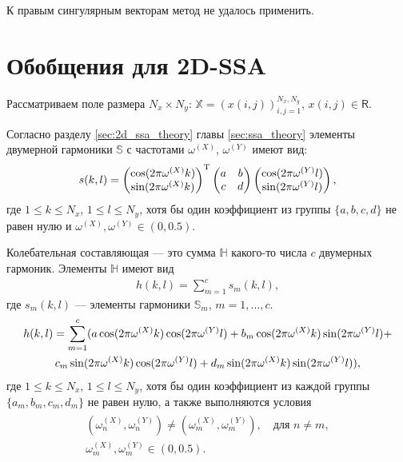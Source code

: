 \documentclass[specialist,
               substylefile = spbu.rtx,
               subf,href,colorlinks=true, 12pt]{disser}
\begin{document}
К правым сингулярным векторам метод не удалось применить.

\newpage
\section{Обобщения для 2D-SSA}

Рассматриваем поле размера $N_x \times N_y$: $\mathbb{X}= \left(x(i,j) \right)_{i,j=1}^{N_x,N_y}$, $x(i,j) \in \mathsf{R}$.

Согласно разделу \ref{sec:2d_ssa_theory} главы \ref{sec:ssa_theory} элементы двумерной гармоники $\mathbb{S}$ с частотами $\omega^{(X)}$, $\omega^{(Y)}$ имеют вид:
\begin{gather} \label{eq:2d_cos_el}
\notag
s(k,l) =  \left(
\begin{matrix}
\cos(2\pi \omega^{(X)}k) \\ \notag
\sin(2\pi \omega^{(X)}k)
\end{matrix}
\right)^{\mathrm{T}}
 \left(
\begin{matrix}
a & b \\
c & d
\end{matrix}
\right)
 \left(
\begin{matrix}
\cos(2\pi \omega^{(Y)}l) \\ \notag
\sin(2\pi \omega^{(Y)}l)
\end{matrix}
\right),
\notag
\end{gather}
где $1 \leqslant k \leqslant N_x$, $1 \leqslant l \leqslant N_y$, хотя бы один коэффициент из  группы $\{a,b,c,d\}$ не равен нулю и
$\omega^{(X)}, \omega^{(Y)} \in (0,0.5)$.

Колебательная составляющая --- это сумма $\mathbb{H}$ какого-то числа $c$ двумерных гармоник. Элементы $\mathbb{H}$ имеют вид
\begin{gather} \label{eq:2d_cos}
h(k,l) = \sum_{m=1}^{c}{s_m(k,l)},
\end{gather}
где $s_m(k,l)$ --- элементы гармоники $\mathbb{S}_m$, $m=1,\ldots,c$.
\begin{gather}
\notag
h(k,l) = \sum_{m=1}^{c}(a \cos(2\pi \omega^{(X)}k) \cos(2\pi \omega^{(Y)}l) +
b_m \cos(2\pi \omega^{(X)}k) \sin(2\pi \omega^{(Y)}l) + \\ \label{eq:2d_cos_el}
c_m \sin(2\pi \omega^{(X)}k) \cos(2\pi \omega^{(Y)}l) +
d_m \sin(2\pi \omega^{(X)}k) \sin(2\pi \omega^{(Y)}l)),
\end{gather}
где $1 \leqslant k \leqslant N_x$, $1 \leqslant l \leqslant N_y$, хотя бы один коэффициент из каждой группы $\{a_m,b_m,c_m,d_m\}$ не равен нулю, а также выполняются условия
\begin{align} \label{eq:2d_omega}
\begin{matrix}
(\omega_n^{(X)}, \omega_n^{(Y)}) \not = (\omega_m^{(X)}, \omega_m^{(Y)}), \quad \text{для } n \not= m,\\
\omega_m^{(X)}, \omega_m^{(Y)} \in (0,0.5).
\end{matrix}
\end{align}
\end{document}
